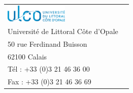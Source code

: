 \begin{titlepage}
\begin{center}
		\begin{footnotesize}
			\begin{tabular}{p{10cm} r}
			\includegraphics[width=3cm]{images/logo_ulco}
				&  \\ %
			Université de Littoral Côte d'Opale
				& \pepit{} \\
			50 rue Ferdinand Buisson 
				& \pepitSite{} \\
			62100 Calais
				&  \\ %
			Tél : +33 (0)3 21 46 36 00
				&  \\
			Fax : +33 (0)3 21 46 36 69
				&  \\
			\end{tabular}
		\end{footnotesize}
\end{center}

\end{titlepage}
\newpage
\null
\newpage
